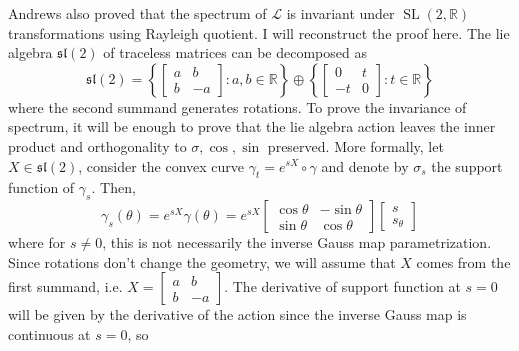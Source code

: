 \documentclass[12pt,a4paper]{article}
\newcommand{\R}{\mathbb{R}}
\begin{document}
Andrews also proved that the spectrum of $ \mathcal{L} $ is invariant under $ \operatorname{SL}(2, \R) $ transformations using Rayleigh quotient. I will reconstruct the proof here. The lie algebra $ \mathfrak{sl}(2) $ of traceless matrices can be decomposed as 
\[ \mathfrak{sl}(2) = \left\{ \begin{bmatrix}
   a & b\\
   b & -a
\end{bmatrix} : a, b \in \R\right\} \oplus \left\{\begin{bmatrix}
   0 & t \\
   -t & 0
\end{bmatrix} : t \in \R \right\} \]
where the second summand generates rotations. To prove the invariance of spectrum, it will be enough to prove that the lie algebra action leaves the inner product and orthogonality to $ \sigma, \cos, \sin $ preserved. More formally, let $ X \in \mathfrak{sl}(2) $, consider the convex curve $ \gamma_{t} = e^{sX} \circ \gamma $ and denote by $ \sigma_{s} $ the support function of $ \gamma_{s} $. Then, 
\[ \gamma_{s}(\theta) = e^{sX} \gamma(\theta) = e^{sX} \begin{bmatrix}
   \cos \theta & -\sin \theta \\
   \sin \theta & \cos \theta
\end{bmatrix} \begin{bmatrix}
   s \\
   s_{\theta}
\end{bmatrix} \]
where for $ s \neq 0 $, this is not necessarily the inverse Gauss map parametrization. Since rotations don't change the geometry, we will assume that $ X $ comes from the first summand, i.e. $ X = \begin{bmatrix}
   a & b \\
   b & -a
\end{bmatrix} $. The derivative of support function at $ s=0 $ will be given by the derivative of the action since the inverse Gauss map is continuous at $ s = 0 $, so 
\end{document}
